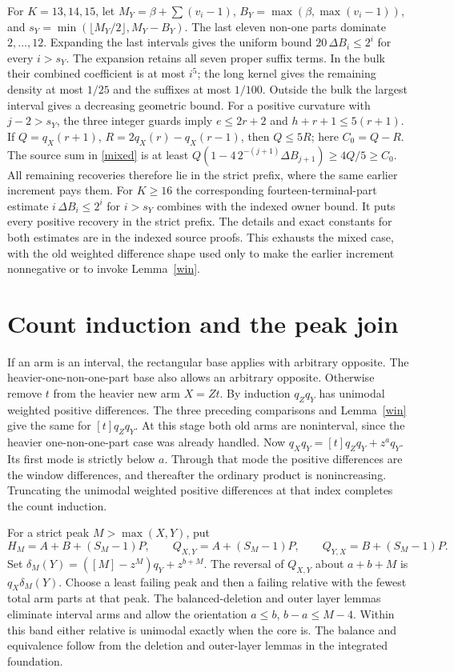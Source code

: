 \documentclass[11pt]{article}
\begin{document}
For \(K=13,14,15\), let \(M_Y=\beta+\sum(v_i-1)\),
\(B_Y=\max(\beta,\max(v_i-1))\), and
\(s_Y=\min(\lfloor M_Y/2\rfloor,M_Y-B_Y)\).
The last eleven non-one parts dominate \(2,\ldots,12\).
Expanding the last intervals gives the uniform bound
\(20\,\Delta B_i\le2^i\) for every \(i>s_Y\).
The expansion retains all seven proper suffix terms. In the bulk
their combined coefficient is at most \(i^5\); the long kernel gives
the remaining density at most \(1/25\) and the suffixes at most
\(1/100\). Outside the bulk the largest interval gives a decreasing
geometric bound.
For a positive curvature with \(j-2>s_Y\), the three integer
guards imply \(e\le2r+2\) and \(h+r+1\le5(r+1)\).
If \(Q=q_X(r+1)\), \(R=2q_X(r)-q_X(r-1)\), then \(Q\le5R\);
here \(C_0=Q-R\).
The source sum in \eqref{mixed} is at least
\(Q(1-4\,2^{-(j+1)}\Delta B_{j+1})\ge4Q/5\ge C_0\).
All remaining recoveries therefore lie in the strict prefix, where
the same earlier increment pays them. For \(K\ge16\) the corresponding
fourteen-terminal-part estimate \(i\,\Delta B_i\le2^i\) for \(i>s_Y\)
combines with the indexed owner bound. It puts every positive
recovery in the strict prefix. The details and exact constants for
both estimates are in the indexed source proofs.
This exhausts the mixed case, with the old weighted difference shape
used only to make the earlier increment nonnegative or to invoke
Lemma~\ref{win}.

\section{Count induction and the peak join}
If an arm is an interval, the rectangular base applies with arbitrary
opposite. The heavier-one-non-one-part base also allows an arbitrary
opposite. Otherwise remove \(t\) from the heavier new arm \(X=Zt\).
By induction \(q_Zq_Y\) has unimodal weighted positive differences.
The three preceding comparisons and Lemma~\ref{win} give the same for
\([t]q_Zq_Y\). At this stage both old arms are noninterval, since the heavier
one-non-one-part case was already handled. Now
\(
 q_Xq_Y=[t]q_Zq_Y+z^a q_Y.
\)
Its first mode is strictly below \(a\). Through that mode the positive
differences are the window differences, and thereafter the ordinary
product is nonincreasing. Truncating the unimodal weighted positive
differences at that index completes the count induction.

For a strict peak \(M>\max(X,Y)\), put
\[
 H_M=A+B+(S_M-1)P,\qquad
 Q_{X,Y}=A+(S_M-1)P,\qquad Q_{Y,X}=B+(S_M-1)P .
\]
Set \(\delta_M(Y)=([M]-z^M)q_Y+z^{b+M}\).
The reversal of \(Q_{X,Y}\) about \(a+b+M\) is \(q_X\delta_M(Y)\).
Choose a least failing peak and then a failing relative with the
fewest total arm parts at that peak. The balanced-deletion and outer
layer lemmas eliminate interval arms and allow the orientation
\(a\le b\), \(b-a\le M-4\). Within this band either relative is
unimodal exactly when the core is. The balance and equivalence follow
from the deletion and outer-layer lemmas in the integrated foundation.
\end{document}
